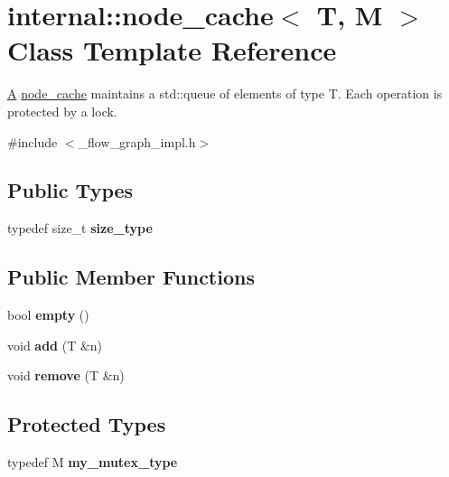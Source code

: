 \hypertarget{classinternal_1_1node__cache}{}\section{internal\+:\+:node\+\_\+cache$<$ T, M $>$ Class Template Reference}
\label{classinternal_1_1node__cache}


\hyperlink{structA}{A} \hyperlink{classinternal_1_1node__cache}{node\+\_\+cache} maintains a std\+::queue of elements of type T. Each operation is protected by a lock.  




{\ttfamily \#include $<$\+\_\+flow\+\_\+graph\+\_\+impl.\+h$>$}

\subsection*{Public Types}
\begin{DoxyCompactItemize}
\item 
\hypertarget{classinternal_1_1node__cache_ab15071138f28f5fcdfd5f3d10c218d1a}{}typedef size\+\_\+t {\bfseries size\+\_\+type}\label{classinternal_1_1node__cache_ab15071138f28f5fcdfd5f3d10c218d1a}

\end{DoxyCompactItemize}
\subsection*{Public Member Functions}
\begin{DoxyCompactItemize}
\item 
\hypertarget{classinternal_1_1node__cache_a4c8e536637870d47b3cf0b99ccb3f497}{}bool {\bfseries empty} ()\label{classinternal_1_1node__cache_a4c8e536637870d47b3cf0b99ccb3f497}

\item 
\hypertarget{classinternal_1_1node__cache_ae6c8b74005e34d084ad32e3dd8c0f8e4}{}void {\bfseries add} (T \&n)\label{classinternal_1_1node__cache_ae6c8b74005e34d084ad32e3dd8c0f8e4}

\item 
\hypertarget{classinternal_1_1node__cache_aeaaf9116532e4c368f3a26076703ef73}{}void {\bfseries remove} (T \&n)\label{classinternal_1_1node__cache_aeaaf9116532e4c368f3a26076703ef73}

\end{DoxyCompactItemize}
\subsection*{Protected Types}
\begin{DoxyCompactItemize}
\item 
\hypertarget{classinternal_1_1node__cache_a4010ded01a11f7df358531fbefb024f2}{}typedef M {\bfseries my\+\_\+mutex\+\_\+type}\label{classinternal_1_1node__cache_a4010ded01a11f7df358531fbefb024f2}

\end{DoxyCompactItemize}

